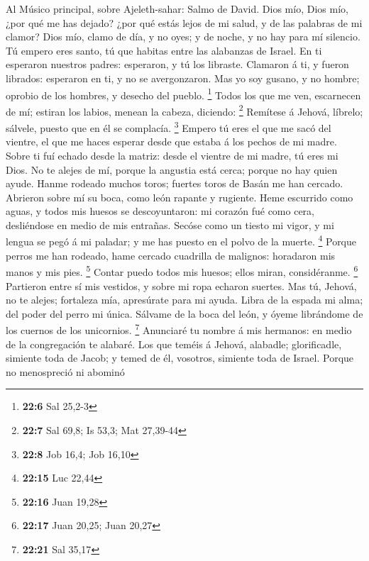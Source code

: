  Al Músico principal, sobre Ajeleth-sahar: Salmo de David.
Dios mío, Dios mío, ¿por qué me has dejado? ¿por qué estás lejos de mi
salud, y de las palabras de mi clamor?  Dios mío, clamo de
día, y no oyes; y de noche, y no hay para mí silencio.  Tú
empero eres santo, tú que habitas entre las alabanzas de Israel.
 En ti esperaron nuestros padres: esperaron, y tú los
libraste.  Clamaron á ti, y fueron librados: esperaron en
ti, y no se avergonzaron.  Mas yo soy gusano, y no hombre;
oprobio de los hombres, y desecho del pueblo. \footnote{\textbf{22:6}
  Sal 25,2-3}  Todos los que me ven, escarnecen de mí;
estiran los labios, menean la cabeza, diciendo: \footnote{\textbf{22:7}
  Sal 69,8; Is 53,3; Mat 27,39-44}  Remítese á Jehová,
líbrelo; sálvele, puesto que en él se complacía. \footnote{\textbf{22:8}
  Job 16,4; Job 16,10}  Empero tú eres el que me sacó del
vientre, el que me haces esperar desde que estaba á los pechos de mi
madre.  Sobre ti fuí echado desde la matriz: desde el
vientre de mi madre, tú eres mi Dios.  No te alejes de mí,
porque la angustia está cerca; porque no hay quien ayude. 
Hanme rodeado muchos toros; fuertes toros de Basán me han cercado.
 Abrieron sobre mí su boca, como león rapante y rugiente.
 Heme escurrido como aguas, y todos mis huesos se
descoyuntaron: mi corazón fué como cera, desliéndose en medio de mis
entrañas.  Secóse como un tiesto mi vigor, y mi lengua se
pegó á mi paladar; y me has puesto en el polvo de la muerte. \footnote{\textbf{22:15}
  Luc 22,44}  Porque perros me han rodeado, hame cercado
cuadrilla de malignos: horadaron mis manos y mis pies. \footnote{\textbf{22:16}
  Juan 19,28}  Contar puedo todos mis huesos; ellos miran,
considéranme. \footnote{\textbf{22:17} Juan 20,25; Juan 20,27}
 Partieron entre sí mis vestidos, y sobre mi ropa echaron
suertes.  Mas tú, Jehová, no te alejes; fortaleza mía,
apresúrate para mi ayuda.  Libra de la espada mi alma; del
poder del perro mi única.  Sálvame de la boca del león, y
óyeme librándome de los cuernos de los unicornios. \footnote{\textbf{22:21}
  Sal 35,17}  Anunciaré tu nombre á mis hermanos: en medio
de la congregación te alabaré.  Los que teméis á Jehová,
alabadle; glorificadle, simiente toda de Jacob; y temed de él, vosotros,
simiente toda de Israel.  Porque no menospreció ni abominó
